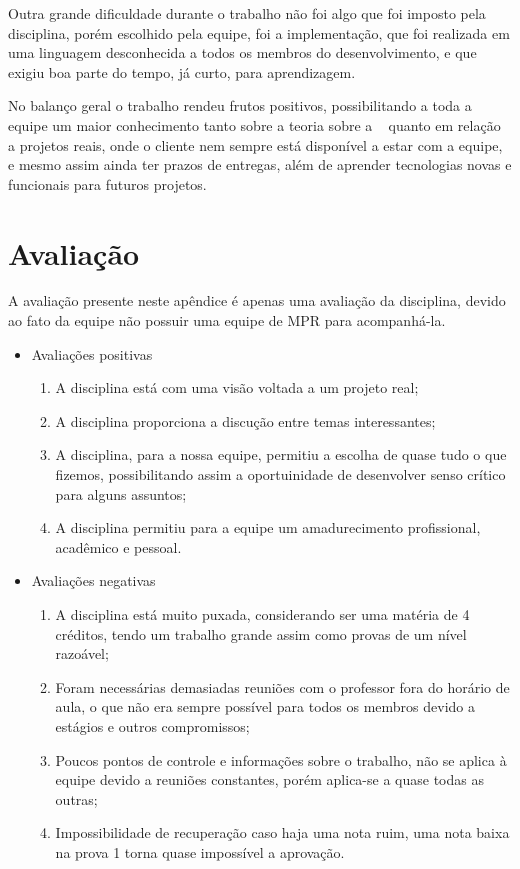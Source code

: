 Outra grande dificuldade durante o trabalho não foi algo que foi imposto pela disciplina, porém escolhido pela equipe, foi a implementação, que foi realizada em uma linguagem desconhecida a todos os membros do desenvolvimento, e que exigiu boa parte do tempo, já curto, para aprendizagem.

No balanço geral o trabalho rendeu frutos positivos, possibilitando a toda a equipe um maior conhecimento tanto sobre a teoria sobre a \er~ quanto em relação a projetos reais, onde o cliente nem sempre está disponível a estar com a equipe, e mesmo assim ainda ter prazos de entregas, além de aprender tecnologias novas e funcionais para futuros projetos.

\chapter{Avaliação}

A avaliação presente neste apêndice é apenas uma avaliação da disciplina, devido ao fato da equipe não possuir uma equipe de MPR para acompanhá-la.

\begin{itemize}
	\item Avaliações positivas
		\begin{enumerate}
			\item A disciplina está com uma visão voltada a um projeto real;
			\item A disciplina proporciona a discução entre temas interessantes;
			\item A disciplina, para a nossa equipe, permitiu a escolha de quase tudo o que fizemos, possibilitando assim a oportuinidade de desenvolver senso crítico para alguns assuntos;
			\item A disciplina permitiu para a equipe um amadurecimento profissional, acadêmico e pessoal.
		\end{enumerate}

	\item Avaliações negativas
		\begin{enumerate}
			\item A disciplina está muito puxada, considerando ser uma matéria de 4 créditos, tendo um trabalho grande assim como provas de um nível razoável;
			\item Foram necessárias demasiadas reuniões com o professor fora do horário de aula, o que não era sempre possível para todos os membros devido a estágios e outros compromissos;
			\item Poucos pontos de controle e informações sobre o trabalho, não se aplica à equipe devido a reuniões constantes, porém aplica-se a quase todas as outras;
			\item Impossibilidade de recuperação caso haja uma nota ruim, uma nota baixa na prova 1 torna quase impossível a aprovação.
		\end{enumerate}
\end{itemize}

